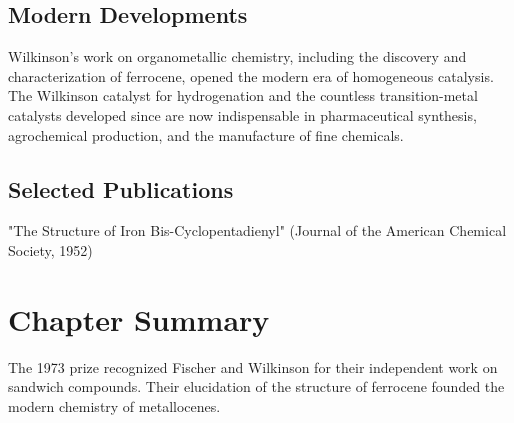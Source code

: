 \subsection*{Modern Developments}

Wilkinson's work on organometallic chemistry, including the discovery and characterization of ferrocene, opened the modern era of homogeneous catalysis. The Wilkinson catalyst for hydrogenation and the countless transition-metal catalysts developed since are now indispensable in pharmaceutical synthesis, agrochemical production, and the manufacture of fine chemicals.

\subsection*{Selected Publications}

"The Structure of Iron Bis-Cyclopentadienyl" (Journal of the American Chemical Society, 1952)

\clearpage

\section*{Chapter Summary}

The 1973 prize recognized Fischer and Wilkinson for their independent work on sandwich compounds. Their elucidation of the structure of ferrocene founded the modern chemistry of metallocenes.

